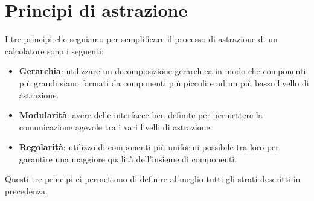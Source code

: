 \section*{Principi di astrazione}
I tre principi che seguiamo per semplificare il processo di astrazione di un calcolatore sono i
seguenti:
\begin{itemize}
	\item \textbf{Gerarchia}: utilizzare un decomposizione gerarchica in modo che componenti più
	      grandi siano formati da componenti più piccoli e ad un più basso livello di astrazione.
	\item \textbf{Modularità}: avere delle interfacce ben definite per permettere la comunicazione
	      agevole tra i vari livelli di astrazione.
	\item \textbf{Regolarità}: utilizzo di componenti più uniformi possibile tra loro per garantire
	      una maggiore qualità dell'insieme di componenti.
\end{itemize}
Questi tre principi ci permettono di definire al meglio tutti gli strati descritti in precedenza.